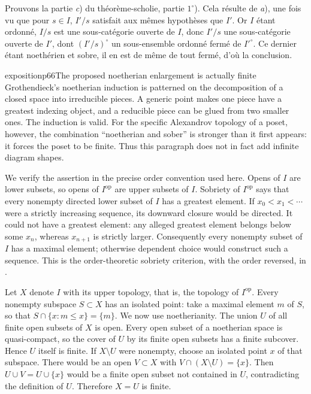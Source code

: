 Prouvons la partie \textit{c}) du théorème-scholie, partie $1^\circ$). Cela résulte de \textit{a}), une fois vu que pour $s \in I$, $I'/s$ satisfait aux mêmes hypothèses que $I'$. Or $I$ étant ordonné, $I/s$ est une sous-catégorie ouverte de $I$, donc $I'/s$ une sous-catégorie ouverte de $I'$, dont $(I'/s)^\circ$ un sous-ensemble ordonné fermé de $I'^{\circ}$. Ce dernier étant noethérien et sobre, il en est de même de tout fermé, d'où la conclusion.

\begin{dcomment}{exposition}{p66}{The proposed noetherian enlargement is actually finite}
Grothendieck's noetherian induction is patterned on the decomposition of a closed space into irreducible pieces. A generic point makes one piece have a greatest indexing object, and a reducible piece can be glued from two smaller ones. The induction is valid. For the specific Alexandrov topology of a poset, however, the combination ``noetherian and sober'' is stronger than it first appears: it forces the poset to be finite. Thus this paragraph does not in fact add infinite diagram shapes.

We verify the assertion in the precise order convention used here. Opens of $I$ are lower subsets, so opens of $I^{\mathrm{op}}$ are upper subsets of $I$. Sobriety of $I^{\mathrm{op}}$ says that every nonempty directed lower subset of $I$ has a greatest element. If $x_0<x_1<\cdots$ were a strictly increasing sequence, its downward closure would be directed. It could not have a greatest element: any alleged greatest element belongs below some $x_n$, whereas $x_{n+1}$ is strictly larger. Consequently every nonempty subset of $I$ has a maximal element; otherwise dependent choice would construct such a sequence. This is the order-theoretic sobriety criterion, with the order reversed, in \citet[Proposition B.5]{Lindenhovius2014}.

Let $X$ denote $I$ with its upper topology, that is, the topology of $I^{\mathrm{op}}$. Every nonempty subspace $S\subset X$ has an isolated point: take a maximal element $m$ of $S$, so that $S\cap\{x:m\leq x\}=\{m\}$. We now use noetherianity. The union $U$ of all finite open subsets of $X$ is open. Every open subset of a noetherian space is quasi-compact, so the cover of $U$ by its finite open subsets has a finite subcover. Hence $U$ itself is finite. If $X\setminus U$ were nonempty, choose an isolated point $x$ of that subspace. There would be an open $V\subset X$ with $V\cap(X\setminus U)=\{x\}$. Then $U\cup V=U\cup\{x\}$ would be a finite open subset not contained in $U$, contradicting the definition of $U$. Therefore $X=U$ is finite.


\end{dcomment}
